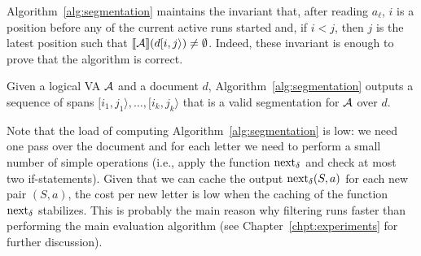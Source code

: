 Algorithm~\ref{alg:segmentation} maintains the invariant that, after reading
$a_\ell$, $i$ is a position before any of the current active runs started and,
if $i < j$,  then $j$ is the latest position such that $\llbracket\mathcal{A}\rrbracket(d[i, j\rangle)
\neq \emptyset$. Indeed, these invariant is enough to prove that the algorithm
is correct.
\begin{theorem}\label{theo:segmentation} Given a logical VA $\mathcal{A}$ and a document
	$d$, Algorithm~\ref{alg:segmentation} outputs a sequence of spans $[i_1,
	j_1\rangle, \ldots, [i_k, j_k\rangle$ that is a valid segmentation for $\mathcal{A}$
	over $d$.
\end{theorem}

Note that the load of computing Algorithm~\ref{alg:segmentation} is low: we need
one pass over the document and for each letter we need to perform a small number
of simple operations (i.e., apply the function $\operatorname{next}_{\delta}$ and check at most two
if-statements). Given that we can cache the output $\operatorname{next}_{\delta}(S, a)$ for each new
pair $(S, a)$, the cost per new letter is low when the caching of the function
$\operatorname{next}_{\delta}$ stabilizes. This is probably the main reason why filtering runs faster
than performing the main evaluation algorithm (see
Chapter~\ref{chpt:experiments} for further discussion).


